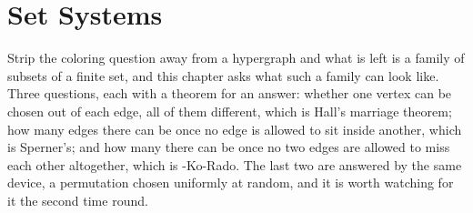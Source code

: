 \chapter{Set Systems} \label{Ch2:CH}
\thispagestyle{empty}

Strip the coloring question away from a hypergraph and what is left is a family of subsets of a finite set, and this chapter asks what such a family can look like. Three questions, each with a theorem for an answer: whether one vertex can be chosen out of each edge, all of them different, which is Hall's marriage theorem; how many edges there can be once no edge is allowed to sit inside another, which is Sperner's; and how many there can be once no two edges are allowed to miss each other altogether, which is \Erdos-Ko-Rado. The last two are answered by the same device, a permutation chosen uniformly at random, and it is worth watching for it the second time round.




